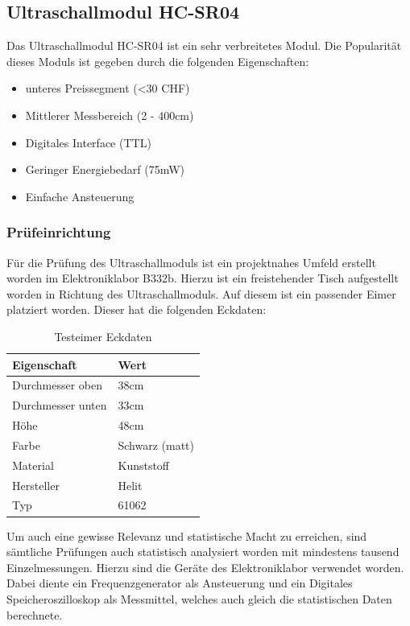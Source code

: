 \subsection{Ultraschallmodul HC-SR04}
Das Ultraschallmodul HC-SR04 ist ein sehr verbreitetes Modul. Die Popularität
dieses Moduls ist gegeben durch die folgenden Eigenschaften:
\begin{itemize}
	\item unteres Preissegment (<30 CHF)
	\item Mittlerer Messbereich (2 - 400cm)
	\item Digitales Interface (TTL)
	\item Geringer Energiebedarf (75mW)
	\item Einfache Ansteuerung
\end{itemize}

\subsubsection{Prüfeinrichtung}
Für die Prüfung des Ultraschallmoduls ist ein projektnahes Umfeld erstellt 
worden im Elektroniklabor B332b. Hierzu ist ein freistehender Tisch aufgestellt
worden in Richtung des Ultraschallmoduls. Auf diesem ist ein passender Eimer
platziert worden. Dieser hat die folgenden Eckdaten:

\begin{table}[h!]
	\centering
	\begin{tabular}{l l}
		Eigenschaft		& Wert \\
		\hline
		Durchmesser oben	& 38cm \\
		Durchmesser unten	& 33cm \\
		Höhe 			& 48cm \\
		Farbe 			& Schwarz (matt) \\
		Material		& Kunststoff \\
		Hersteller		& Helit \\
		Typ			& 61062
	\end{tabular}
	\caption{Testeimer Eckdaten}
	\label{tab:testeimer}
\end{table}

Um auch eine gewisse Relevanz und statistische Macht zu erreichen, sind 
sämtliche Prüfungen auch statistisch analysiert worden mit mindestens tausend
Einzelmessungen. Hierzu sind die Geräte des Elektroniklabor verwendet worden.
Dabei diente ein Frequenzgenerator als Ansteuerung und ein Digitales 
Speicheroszilloskop als Messmittel, welches auch gleich die statistischen 
Daten berechnete.

